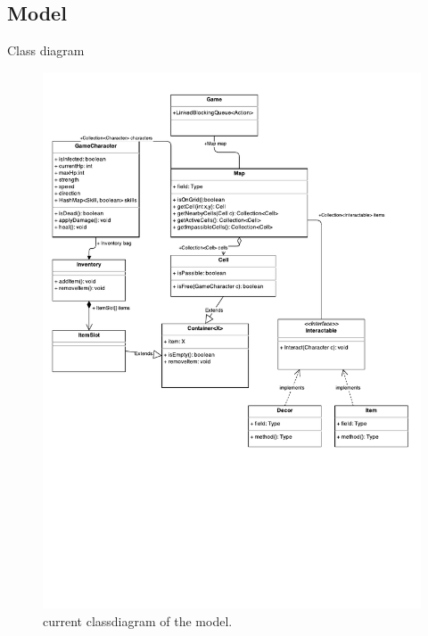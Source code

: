 \subsection{Model}
Class diagram

\begin{figure}[htbp]
	\centering
	\includegraphics[width=\textwidth]{model-classdiagram.pdf}
	\caption{current classdiagram of the model.}
\end{figure}

\FloatBarrier